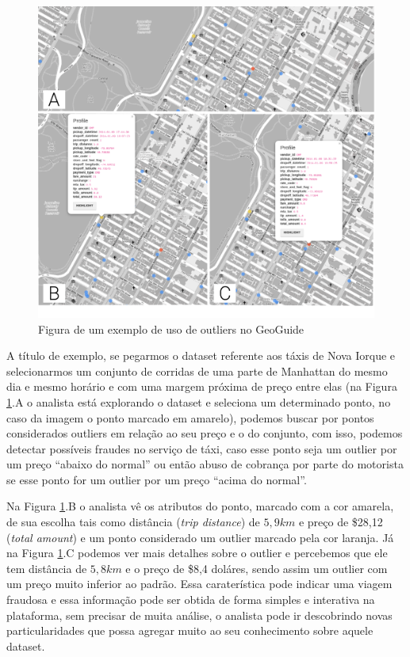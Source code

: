 \begin{figure}[t]
	\centering
	\includegraphics[width=\textwidth]{images/outliers-geoguide.png}
	\caption{Figura de um exemplo de uso de outliers no GeoGuide}
	\label{fig:outliers-geoguide}
	\vspace{-10pt}
\end{figure}

A título de exemplo, se pegarmos o dataset referente aos táxis de Nova Iorque e selecionarmos um conjunto de corridas de uma parte de Manhattan do mesmo dia e mesmo horário e com uma margem próxima de preço entre elas (na Figura \ref{fig:outliers-geoguide}.A o analista está explorando o dataset e seleciona um determinado ponto, no caso da imagem o ponto marcado em amarelo), podemos buscar por pontos considerados outliers em relação ao seu preço e o do conjunto, com isso, podemos detectar possíveis fraudes no serviço de táxi, caso esse ponto seja um outlier por um preço ``abaixo do normal'' ou então abuso de cobrança por parte do motorista se esse ponto for um outlier por um preço ``acima do normal''.

Na Figura \ref{fig:outliers-geoguide}.B o analista vê os atributos do ponto, marcado com a cor amarela, de sua escolha tais como distância (\textit{trip distance}) de $5,9km$ e preço de \$28,12  (\textit{total amount}) e um ponto considerado um outlier marcado pela cor laranja. Já na Figura \ref{fig:outliers-geoguide}.C podemos ver mais detalhes sobre o outlier e percebemos que ele tem distância de $5,8km$ e o preço de \$8,4 doláres, sendo assim um outlier com um preço muito inferior ao padrão. Essa caraterística pode indicar uma viagem fraudosa e essa informação pode ser obtida de forma simples e interativa na plataforma, sem precisar de muita análise, o analista pode ir descobrindo novas particularidades que possa agregar muito ao seu conhecimento sobre aquele dataset.

